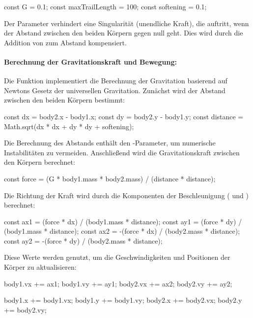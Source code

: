 \documentclass[a4paper,12pt,twoside]{article}
\begin{document}
\begin{javascript}
const G = 0.1;
const maxTrailLength = 100;
const softening = 0.1;
\end{javascript}

Der Parameter  verhindert eine Singularität (unendliche Kraft), die auftritt, wenn der Abstand zwischen den beiden Körpern gegen null geht. Dies wird durch die Addition von  zum Abstand kompensiert.

\paragraph{Berechnung der Gravitationskraft und Bewegung:}
Die Funktion  implementiert die Berechnung der Gravitation basierend auf Newtons Gesetz der universellen Gravitation. Zunächst wird der Abstand zwischen den beiden Körpern bestimmt:

\begin{javascript}
const dx = body2.x - body1.x;
const dy = body2.y - body1.y;
const distance = Math.sqrt(dx * dx + dy * dy + softening);
\end{javascript}

Die Berechnung des Abstands  enthält den -Parameter, um numerische Instabilitäten zu vermeiden. Anschließend wird die Gravitationskraft zwischen den Körpern berechnet:

\begin{javascript}
const force = (G * body1.mass * body2.mass) / (distance * distance);
\end{javascript}

Die Richtung der Kraft wird durch die Komponenten der Beschleunigung ( und ) berechnet:

\begin{javascript}
const ax1 = (force * dx) / (body1.mass * distance);
const ay1 = (force * dy) / (body1.mass * distance);
const ax2 = -(force * dx) / (body2.mass * distance);
const ay2 = -(force * dy) / (body2.mass * distance);
\end{javascript}

Diese Werte werden genutzt, um die Geschwindigkeiten und Positionen der Körper zu aktualisieren:

\begin{javascript}
body1.vx += ax1;
body1.vy += ay1;
body2.vx += ax2;
body2.vy += ay2;

body1.x += body1.vx;
body1.y += body1.vy;
body2.x += body2.vx;
body2.y += body2.vy;
\end{javascript}
\end{document}
